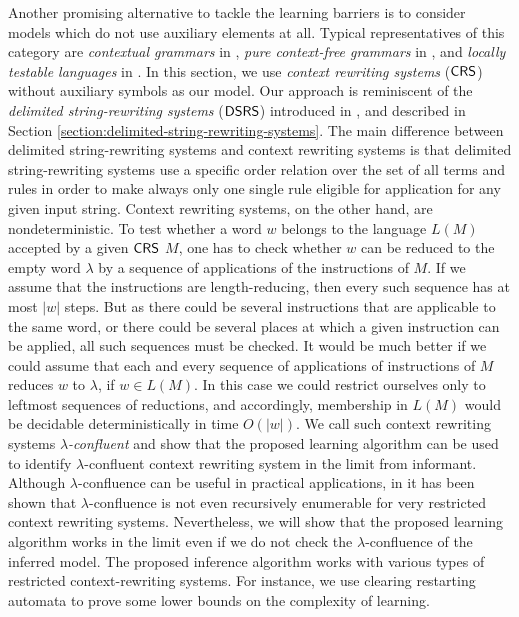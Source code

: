 Another promising alternative to tackle the learning barriers is to consider models which do not use auxiliary elements at all. Typical representatives of this category are \emph{contextual grammars} in \cite{M69}, \emph{pure context-free grammars} in \cite{maurer1980pure}, and \emph{locally testable languages} in \cite{MR74,Zal72}. In this section, we use \emph{context rewriting systems} ($\textup{\sf CRS\/}$) without auxiliary symbols as our model. Our approach is reminiscent of the \emph{delimited string-rewriting systems} ($\textup{\sf DSRS}$) introduced in \cite{Eyraud2007}, and described in Section \ref{section:delimited-string-rewriting-systems}. The main difference between delimited string-rewriting systems and context rewriting systems is that delimited string-rewriting systems use a specific order relation over the set of all terms and rules in order to make always only one single rule eligible for application for any given input string. Context rewriting systems, on the other hand, are nondeterministic. To test whether a word $w$ belongs to the language $L(M)$ accepted by a given $\textup{\sf CRS\/}$ $M$, one has to check whether $w$ can be reduced to the empty word $\lambda$ by a sequence of applications of the instructions of $M$. If we assume that the instructions are length-reducing, then every such sequence has at most $|w|$ steps. But as there could be several instructions that are applicable to the same word, or there could be several places at which a given instruction can be applied, all such sequences must be checked. It would be much better if we could assume that each and every sequence of applications of instructions of $M$ reduces $w$ to $\lambda$, if $w \in L(M)$. In this case we could restrict ourselves only to leftmost sequences of reductions, and accordingly, membership in $L(M)$ would be decidable deterministically in time $O(|w|)$. We call such context rewriting systems \emph{$\lambda$-confluent} and show that the proposed learning algorithm can be used to identify $\lambda$-confluent context rewriting system in the limit from informant. Although $\lambda$-confluence can be useful in practical applications, in \cite{OM15} it has been shown that $\lambda$-confluence is not even recursively enumerable for very restricted context rewriting systems. Nevertheless, we will show that the proposed learning algorithm works in the limit even if we do not check the $\lambda$-confluence of the inferred model. The proposed inference algorithm works with various types of restricted context-rewriting systems. For instance, we use clearing restarting automata to prove some lower bounds on the complexity of learning.

